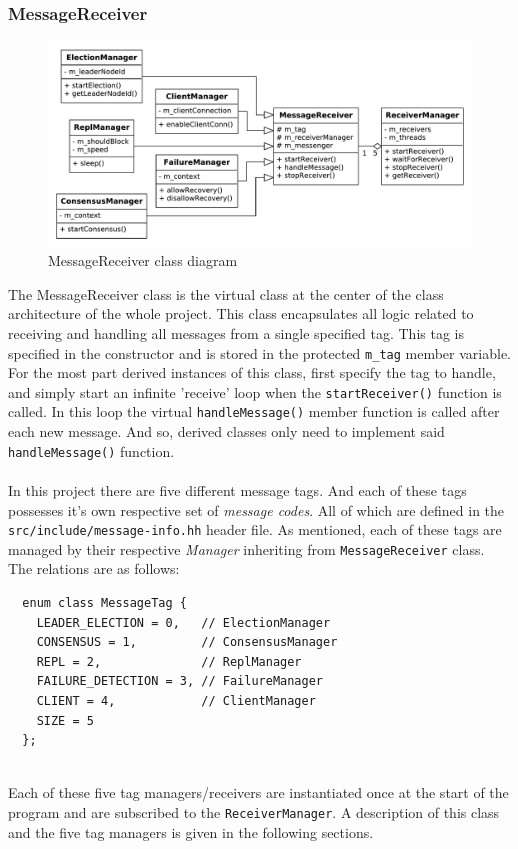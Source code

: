 \documentclass[11pt]{article}
\begin{document}
\subsubsection{MessageReceiver}
\begin{figure}[H]
  \centering
  \includegraphics[scale=0.5]{image/receiver.pdf}
  \caption{MessageReceiver class diagram}
\end{figure}
The MessageReceiver class is the virtual class at the center of the class
architecture of the whole project. This class encapsulates all logic related to
receiving and handling all messages from a single specified tag. This tag is
specified in the constructor and is stored in the protected \texttt{m\_tag}
member variable. For the most part derived instances of this class, first
specify the tag to handle, and simply start an infinite 'receive' loop when the
\texttt{startReceiver()} function is called. In this loop the virtual
\texttt{handleMessage()} member function is called after each new message. And
so, derived classes only need to implement said \texttt{handleMessage()}
function.\\\\ In this project there are five different message tags. And
each of these tags possesses it's own respective set of \textit{message
  codes}. All of which are defined in the \texttt{src/include/message-info.hh}
header file. As mentioned, each of these tags are managed by their respective
\textit{Manager} inheriting from \texttt{MessageReceiver} class. The relations
are as follows:\\
\begin{verbatim}
  enum class MessageTag {
    LEADER_ELECTION = 0,   // ElectionManager
    CONSENSUS = 1,         // ConsensusManager
    REPL = 2,              // ReplManager
    FAILURE_DETECTION = 3, // FailureManager
    CLIENT = 4,            // ClientManager
    SIZE = 5
  };
\end{verbatim}
\ \\
Each of these five tag managers/receivers are instantiated once at the start of
the program and are subscribed to the \texttt{ReceiverManager}. A description of
this class and the five tag managers is given in the following sections.
\end{document}
